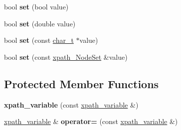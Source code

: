 \begin{DoxyCompactItemize}
\item 
\hypertarget{classphys_1_1xml_1_1xpath__variable_a03fbb2a079668c654d665e5753c8fa94}{
bool {\bfseries set} (bool value)}
\label{d8/d2c/classphys_1_1xml_1_1xpath__variable_a03fbb2a079668c654d665e5753c8fa94}

\item 
\hypertarget{classphys_1_1xml_1_1xpath__variable_af8fd4c5a9ed9810ae68cd5d2a5d5539b}{
bool {\bfseries set} (double value)}
\label{d8/d2c/classphys_1_1xml_1_1xpath__variable_af8fd4c5a9ed9810ae68cd5d2a5d5539b}

\item 
\hypertarget{classphys_1_1xml_1_1xpath__variable_a7a09bf4e7bc330ea42782963dec8150d}{
bool {\bfseries set} (const \hyperlink{namespacephys_1_1xml_afc87705cd1c2917d87b879715a2d8f6e}{char\_\-t} $\ast$value)}
\label{d8/d2c/classphys_1_1xml_1_1xpath__variable_a7a09bf4e7bc330ea42782963dec8150d}

\item 
\hypertarget{classphys_1_1xml_1_1xpath__variable_a3e235f6265268eeca22cc8e048bf8bca}{
bool {\bfseries set} (const \hyperlink{classphys_1_1xml_1_1xpath__NodeSet}{xpath\_\-NodeSet} \&value)}
\label{d8/d2c/classphys_1_1xml_1_1xpath__variable_a3e235f6265268eeca22cc8e048bf8bca}

\end{DoxyCompactItemize}
\subsection*{Protected Member Functions}
\begin{DoxyCompactItemize}
\item 
\hypertarget{classphys_1_1xml_1_1xpath__variable_a3728b15b88b306502bd73bd5f10349ac}{
{\bfseries xpath\_\-variable} (const \hyperlink{classphys_1_1xml_1_1xpath__variable}{xpath\_\-variable} \&)}
\label{d8/d2c/classphys_1_1xml_1_1xpath__variable_a3728b15b88b306502bd73bd5f10349ac}

\item 
\hypertarget{classphys_1_1xml_1_1xpath__variable_a6db04e633c4bf171fac5ba74f4bf4b1b}{
\hyperlink{classphys_1_1xml_1_1xpath__variable}{xpath\_\-variable} \& {\bfseries operator=} (const \hyperlink{classphys_1_1xml_1_1xpath__variable}{xpath\_\-variable} \&)}
\label{d8/d2c/classphys_1_1xml_1_1xpath__variable_a6db04e633c4bf171fac5ba74f4bf4b1b}

\end{DoxyCompactItemize}
